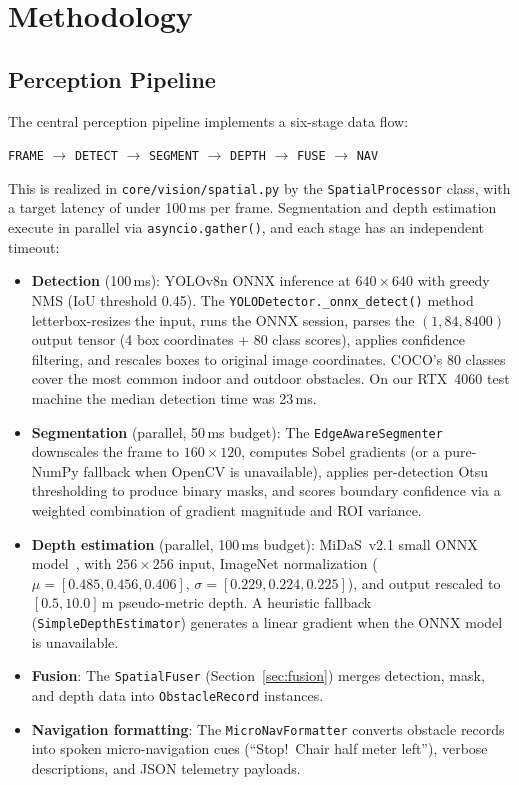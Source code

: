 \section{Methodology}
\label{sec:methods}

\subsection{Perception Pipeline}

The central perception pipeline implements a six-stage data flow:

\begin{center}
\texttt{FRAME} $\to$ \texttt{DETECT} $\to$ \texttt{SEGMENT} $\to$ \texttt{DEPTH} $\to$ \texttt{FUSE} $\to$ \texttt{NAV}
\end{center}

This is realized in \texttt{core/vision/spatial.py} by the \texttt{SpatialProcessor} class, with a target latency of under 100\,ms per frame. Segmentation and depth estimation execute in parallel via \texttt{asyncio.gather()}, and each stage has an independent timeout:

\begin{itemize}
    \item \textbf{Detection} (100\,ms): YOLOv8n ONNX inference at $640{\times}640$ with greedy NMS (IoU threshold 0.45). The \texttt{YOLODetector.\_onnx\_detect()} method letterbox-resizes the input, runs the ONNX session, parses the $(1, 84, 8400)$ output tensor (4 box coordinates + 80 class scores), applies confidence filtering, and rescales boxes to original image coordinates. COCO's 80 classes cover the most common indoor and outdoor obstacles. On our RTX~4060 test machine the median detection time was 23\,ms.
    \item \textbf{Segmentation} (parallel, 50\,ms budget): The \texttt{EdgeAwareSegmenter} downscales the frame to $160{\times}120$, computes Sobel gradients (or a pure-NumPy fallback when OpenCV is unavailable), applies per-detection Otsu thresholding to produce binary masks, and scores boundary confidence via a weighted combination of gradient magnitude and ROI variance.
    \item \textbf{Depth estimation} (parallel, 100\,ms budget): MiDaS~v2.1 small ONNX model~\cite{ranftl2020midas}, with $256{\times}256$ input, ImageNet normalization ($\mu{=}[0.485,0.456,0.406]$, $\sigma{=}[0.229,0.224,0.225]$), and output rescaled to $[0.5,\allowbreak 10.0]$\,m pseudo-metric depth. A heuristic fallback (\texttt{SimpleDepthEstimator}) generates a linear gradient when the ONNX model is unavailable.
    \item \textbf{Fusion}: The \texttt{SpatialFuser} (Section~\ref{sec:fusion}) merges detection, mask, and depth data into \texttt{ObstacleRecord} instances.
    \item \textbf{Navigation formatting}: The \texttt{MicroNavFormatter} converts obstacle records into spoken micro-navigation cues (``Stop!\ Chair half meter left''), verbose descriptions, and JSON telemetry payloads.
\end{itemize}

